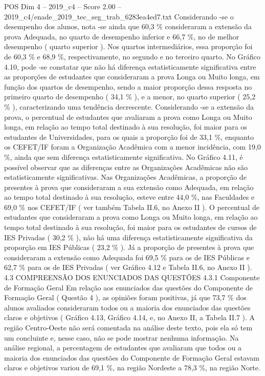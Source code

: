\begin{textsample}{POS Dim 4 – 2019\_c4 – Score 2.00 – 2019\_c4/enade\_2019\_tec\_seg\_trab\_6283ea4ed7.txt}
Considerando -se o desempenho dos alunos, nota -se ainda que 60,3 \% consideraram a extensão da prova Adequada, no quarto de desempenho inferior e 66,7 \%, no de melhor desempenho ( quarto superior ).
Nos quartos intermediários, essa proporção foi de 60,3 \% e 68,9 \%, respectivamente, no segundo e no terceiro quarto.
No Gráfico 4.10, pode -se constatar que não há diferença estatisticamente significativa entre as proporções de estudantes que consideraram a prova Longa ou Muito longa, em função dos quartos de desempenho, sendo a maior proporção dessa resposta no primeiro quarto de desempenho ( 34,1 \% ), e a menor, no quarto superior ( 25,2 \% ), caracterizando uma tendência decrescente.
Considerando -se a extensão da prova, o percentual de estudantes que avaliaram a prova como Longa ou Muito longa, em relação ao tempo total destinado à sua resolução, foi maior para os estudantes de Universidades, para os quais a proporção foi de 33,1 \%, enquanto os CEFET/IF foram a Organização Acadêmica com a menor incidência, com 19,0 \%, ainda que sem diferença estatisticamente significativa.
No Gráfico 4.11, é possível observar que as diferenças entre as Organizações Acadêmicas não são estatisticamente significativas.
Nas Organizações Acadêmicas, a proporção de presentes à prova que consideraram a sua extensão como Adequada, em relação ao tempo total destinado à sua resolução, esteve entre 44,0 \%, nas Faculdades e 69,0 \% nos CEFET/IF ( ver também Tabela II.6, no Anexo II ).
O percentual de estudantes que consideraram a prova como Longa ou Muito longa, em relação ao tempo total destinado à sua resolução, foi maior para os estudantes de cursos de IES Privadas ( 30,2 \% ), não há uma diferença estatisticamente significativa da proporção em IES Públicas ( 23,2 \% ).
Já a proporção de presentes à prova que consideraram a extensão como Adequada foi 69,5 \% para os de IES Públicas e 62,7 \% para os de IES Privadas ( ver Gráfico 4.12 e Tabela II.6, no Anexo II ). 4.3 COMPREENSÃO DOS ENUNCIADOS DAS QUESTÕES 4.3.1 Componente de Formação Geral Em relação aos enunciados das questões do Componente de Formação Geral ( Questão 4 ), as opiniões foram positivas, já que 73,7 \% dos alunos avaliados consideraram todos ou a maioria dos enunciados das questões claros e objetivos ( Gráfico 4.13, Gráfico 4.14, e, no Anexo II, a Tabela II.7 ).
A região Centro-Oeste não será comentada na análise deste texto, pois ela só tem um concluinte e, nesse caso, não se pode mostrar nenhuma informação.
Na análise regional, a percentagem de estudantes que avaliaram que todos ou a maioria dos enunciados das questões do Componente de Formação Geral estavam claros e objetivos variou de 69,1 \%, na região Nordeste a 78,3 \%, na região Norte.

\end{textsample}
